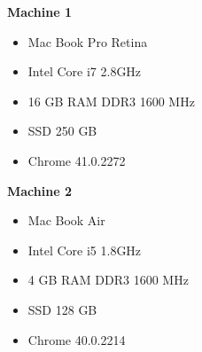 \textbf{Machine 1}
\begin{itemize}
  \item Mac Book Pro Retina
  \item Intel Core i7 2.8GHz
  \item 16 GB RAM DDR3 1600 MHz
  \item SSD 250 GB
  \item Chrome 41.0.2272
\end{itemize}

\textbf{Machine 2}
\begin{itemize}
  \item Mac Book Air
  \item Intel Core i5 1.8GHz
  \item 4 GB RAM DDR3 1600 MHz
  \item SSD 128 GB
  \item Chrome 40.0.2214
\end{itemize}


\pagebreak